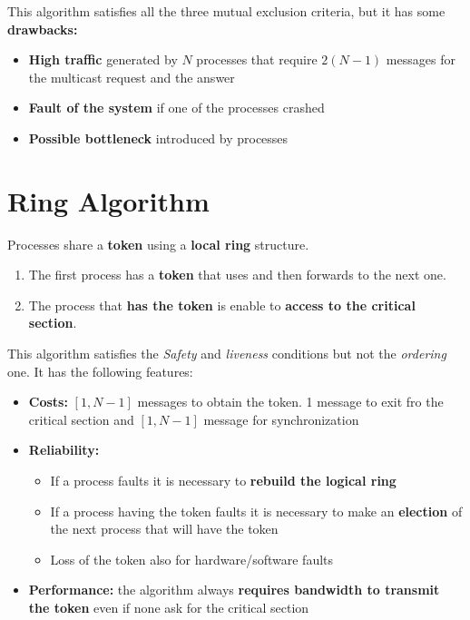 This algorithm satisfies all the three mutual exclusion criteria, but it has some \textbf{drawbacks:}
\begin{itemize}
    \item \textbf{High traffic} generated by \(N\) processes that require \(2(N - 1)\) messages for the multicast request and the answer
    \item \textbf{Fault of the system} if one of the processes crashed
    \item \textbf{Possible bottleneck} introduced by processes
\end{itemize}

\section{Ring Algorithm}
Processes share a \textbf{token} using a \textbf{local ring} structure. 
\begin{enumerate}
    \item The first process has a \textbf{token} that uses and then forwards to the next one.
    \item The process that \textbf{has the token} is enable to \textbf{access to the critical section}.
\end{enumerate} 
This algorithm satisfies the \textit{Safety} and \textit{liveness} conditions but not the \textit{ordering} one. It has the following features:
\begin{itemize}
    \item \textbf{Costs:} \([1, N - 1]\) messages to obtain the token. 1 message to exit fro the critical section and \([1, N - 1]\) message for synchronization
    \item \textbf{Reliability:} 
    \begin{itemize}
        \item If a process faults it is necessary to \textbf{rebuild the logical ring}
        \item If a process having the token faults it is necessary to make an \textbf{election} of the next process that will have the token
        \item Loss of the token also for hardware/software faults
    \end{itemize}
    \item \textbf{Performance:} the algorithm always \textbf{requires bandwidth to transmit the token} even if none ask for the critical section
\end{itemize}

